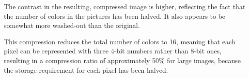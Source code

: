 \documentclass{article}
\begin{document}
\begin{enumerate}
\pagebreak
The contrast in the resulting, compressed image is higher, reflecting
the fact that the number of colors in the pictures has been halved. It
also appears to be somewhat more washed-out than the original.

This compression reduces the total number of colors to 16, meaning
that each pixel can be represented with three 4-bit numbers rather
than 8-bit ones, resulting in a compression ratio of approximately
50\% for large images, because the storage requirement for each pixel
has been halved. 




\end{enumerate}
\end{document}
